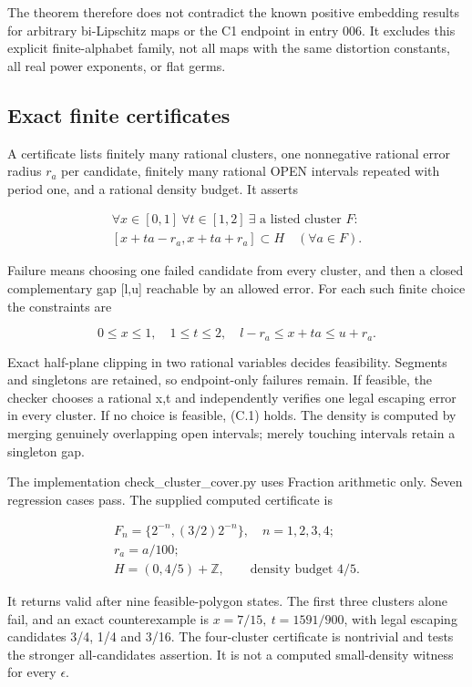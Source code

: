 \documentclass[
  11pt,
]{article}
\theoremstyle{remark}\newtheorem{remark}[theorem]{Remark}
\begin{document}
The theorem therefore does not contradict the known positive embedding
results for arbitrary bi-Lipschitz maps or the C1 endpoint in entry 006.
It excludes this explicit finite-alphabet family, not all maps with the
same distortion constants, all real power exponents, or flat germs.

\subsection{Exact finite certificates}\label{exact-finite-certificates}

A certificate lists finitely many rational clusters, one nonnegative
rational error radius \(r_a\) per candidate, finitely many rational OPEN
intervals repeated with period one, and a rational density budget. It
asserts

\[
\begin{gathered}\forall x\in[0,1]\ \forall t\in[1,2]\ \exists\text{ a listed cluster }F:\\ [x+ta-r_a,x+ta+r_a]\subset H\quad(\forall a\in F).\end{gathered}\tag{C.1}
\]

Failure means choosing one failed candidate from every cluster, and then
a closed complementary gap {[}l,u{]} reachable by an allowed error. For
each such finite choice the constraints are

\[
0\le x\le1,\quad1\le t\le2,\quad l-r_a\le x+ta\le u+r_a.
\]

Exact half-plane clipping in two rational variables decides feasibility.
Segments and singletons are retained, so endpoint-only failures remain.
If feasible, the checker chooses a rational x,t and independently
verifies one legal escaping error in every cluster. If no choice is
feasible, (C.1) holds. The density is computed by merging genuinely
overlapping open intervals; merely touching intervals retain a singleton
gap.

The implementation check\_cluster\_cover.py uses Fraction arithmetic
only. Seven regression cases pass. The supplied computed certificate is

\[
\begin{gathered}F_n=\{2^{-n},(3/2)2^{-n}\},\quad n=1,2,3,4;\\ r_a=a/100;\\ H=(0,4/5)+\mathbb Z,\qquad\text{density budget }4/5.\end{gathered}
\]

It returns valid after nine feasible-polygon states. The first three
clusters alone fail, and an exact counterexample is
\(x=7/15,\ t=1591/900\), with legal escaping candidates 3/4, 1/4 and
3/16. The four-cluster certificate is nontrivial and tests the stronger
all-candidates assertion. It is not a computed small-density witness for
every \(\epsilon\).
\end{document}
